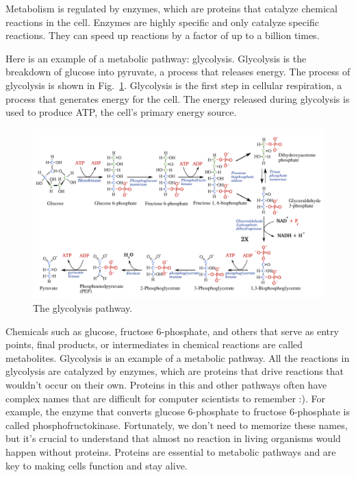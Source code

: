 Metabolism is regulated by enzymes, which are proteins that catalyze chemical reactions in the cell. Enzymes are highly specific and only catalyze specific reactions. They can speed up reactions by a factor of up to a billion times. 

Here is an example of a metabolic pathway: glycolysis. Glycolysis is the breakdown of glucose into pyruvate, a process that releases energy. The process of glycolysis is shown in Fig.~\ref{fig:glycolysis}. Glycolysis is the first step in cellular respiration, a process that generates energy for the cell. The energy released during glycolysis is used to produce ATP, the cell's primary energy source.

\begin{figure}
    \includegraphics{figs/molbiol/glycolysis.png}
    \caption[6pt]{The glycolysis pathway.}
    \label{fig:glycolysis}
\end{figure}

Chemicals such as glucose, fructose 6-phosphate, and others that serve as entry points, final products, or intermediates in chemical reactions are called metabolites. Glycolysis is an example of a metabolic pathway. All the reactions in glycolysis are catalyzed by enzymes, which are proteins that drive reactions that wouldn't occur on their own. Proteins in this and other pathways often have complex names that are difficult for computer scientists to remember :). For example, the enzyme that converts glucose 6-phosphate to fructose 6-phosphate is called phosphofructokinase. Fortunately, we don't need to memorize these names, but it's crucial to understand that almost no reaction in living organisms would happen without proteins. Proteins are essential to metabolic pathways and are key to making cells function and stay alive. 

